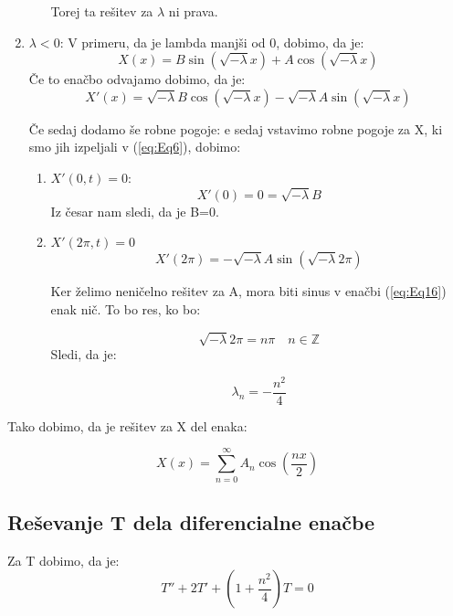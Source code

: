 \documentclass[11pt, a4paper]{article}
\theoremstyle{definition}
\theoremstyle{example}
\theoremstyle{izrek}
\begin{document}
\begin{enumerate}
\begin{enumerate}
Torej ta rešitev za $\lambda$ ni prava.
\end{enumerate}

\item $\lambda<0$:
V primeru, da je lambda manjši od 0, dobimo, da je: 
\begin{equation}
\label{eq:Eq14}
X(x)=B\sin(\sqrt{-\lambda}x)+A\cos(\sqrt{-\lambda}x)
\end{equation}
Če to enačbo odvajamo dobimo, da je: 
$$X'(x)=\sqrt{-\lambda}B\cos(\sqrt{-\lambda}x)-\sqrt{-\lambda}A\sin(\sqrt{-\lambda}x)$$

Če sedaj dodamo še robne pogoje:
e sedaj vstavimo robne pogoje za X, ki smo jih izpeljali v (\ref{eq:Eq6}), dobimo:
\begin{enumerate}
\item $X'(0,t)=0$:  \\
\begin{equation}
\label{eq:Eq15}
X'(0)=0=\sqrt{-\lambda}B
\end{equation}
Iz česar nam sledi, da je B=0.
\item $X'(2 \pi,t)=0$
\begin{equation}
\label{eq:Eq16}
X'(2 \pi)=-\sqrt{-\lambda}A\sin(\sqrt{-\lambda}2 \pi)
\end{equation}

Ker želimo neničelno rešitev za A, mora biti sinus v enačbi (\ref{eq:Eq16}) enak nič. To bo res, ko bo:

\begin{equation}
\label{eq:Eq17}
\sqrt{-\lambda}2 \pi =n \pi \quad n \in \mathbb{Z}
\end{equation}
Sledi, da je:

\begin{equation}
\label{eq:Eq18}
\lambda_n=-\frac{n^2}{4}
\end{equation}
\end{enumerate}
\end{enumerate}

Tako dobimo, da je rešitev za X del enaka: 

\begin{equation}
\label{eq:Eq19}
X(x)=\sum_{n=0}^{\infty} A_n \cos\left(\frac{n x}{2}\right)
\end{equation}
\subsection{Reševanje T dela diferencialne enačbe}
Za T dobimo, da je: 
\begin{equation}
\label{eq:Eq20}
T''+2T'+(1+\frac{n^2}{4})T=0
\end{equation}
\end{document}
